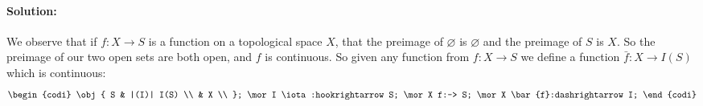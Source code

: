 \documentclass{article}
\begin{document}
\begin{enumerate}
        \paragraph{Solution: }We observe that if $f:X\to S$ is a function on a topological space $X$, that the preimage of $\varnothing$ is $\varnothing$ and the preimage of $S$ is $X$. So the preimage of our two open sets are both open, and $f$ is continuous. So given any function from $f:X\to S$ we define a function $\bar{f}:X\to I(S)$ which is continuous:
        \[ \begin{codi}
            \obj{ S & |(I)| I(S) \\ & X \\ };
            \mor I \iota:hookrightarrow S;
            \mor X f:-> S; 
            \mor X \bar{f}:dashrightarrow I;
        \end{codi} \] 
\end{enumerate}
\end{document}
